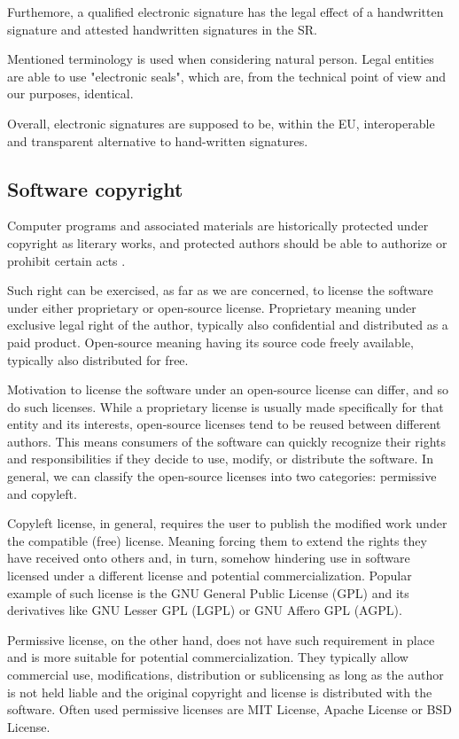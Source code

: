 \documentclass[thesismargins, english, thesislinespacing, twoside, openright, upjsfrontpage]{rnthesis}
\begin{document}
Furthemore, a qualified electronic signature has the legal effect of a handwritten signature \cite{4} and attested handwritten signatures in the SR.

Mentioned terminology is used when considering natural person. Legal entities are able to use "electronic seals", which are, from the technical point of view and our purposes, identical.

Overall, electronic signatures are supposed to be, within the EU, interoperable and transparent alternative to hand-written signatures.

\subsection{Software copyright}

Computer programs and associated materials are historically protected under copyright as literary works, and protected authors should be able to authorize or prohibit certain acts \cite{6}.

Such right can be exercised, as far as we are concerned, to license the software under either proprietary or open-source license.
Proprietary meaning under exclusive legal right of the author, typically also confidential and distributed as a paid product.
Open-source meaning having its source code freely available, typically also distributed for free.

Motivation to license the software under an open-source license can differ, and so do such licenses.
While a proprietary license is usually made specifically for that entity and its interests, open-source licenses tend to be reused between different authors.
This means consumers of the software can quickly recognize their rights and responsibilities if they decide to use, modify, or distribute the software.
In general, we can classify the open-source licenses into two categories: permissive and copyleft.

Copyleft license, in general, requires the user to publish the modified work under the compatible (free) license.
Meaning forcing them to extend the rights they have received onto others and, in turn, somehow hindering use in software licensed under a different license and potential commercialization.
Popular example of such license is the GNU General Public License (GPL) and its derivatives like GNU Lesser GPL (LGPL) or GNU Affero GPL (AGPL).

Permissive license, on the other hand, does not have such requirement in place and is more suitable for potential commercialization.
They typically allow commercial use, modifications, distribution or sublicensing as long as the author is not held liable and the original copyright and license is distributed with the software.
Often used permissive licenses are MIT License, Apache License or BSD License.
\end{document}
